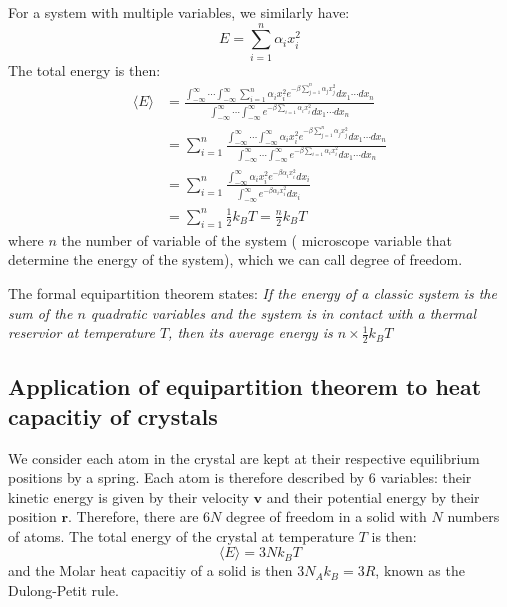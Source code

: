 \documentclass{article}
\begin{document}
For a system with multiple variables, we similarly have:
\begin{equation}
    E = \sum_{i=1}^n \alpha_i x_i^2
\end{equation}
The total energy is then:
\begin{align}
    \langle E \rangle 
        & = \frac{\int_{-\infty}^{\infty}\cdots\int_{-\infty}^{\infty} \sum_{i=1}^n \alpha_i x_i^2 e^{-\beta \sum_{j=1}^n \alpha_j x_j^2} dx_1 \cdots dx_n}{\int_{-\infty}^{\infty}\cdots\int_{-\infty}^{\infty} e^{-\beta \sum_{i=1} \alpha_i x_i^2} dx_1 \cdots dx_n} \\
        & = \sum_{i=1}^n \frac{\int_{-\infty}^{\infty}\cdots\int_{-\infty}^{\infty} \alpha_i x_i^2 e^{-\beta \sum_{j=1}^n \alpha_j x_j^2} dx_1 \cdots dx_n}{\int_{-\infty}^{\infty}\cdots\int_{-\infty}^{\infty} e^{-\beta \sum_{i=1} \alpha_i x_i^2} dx_1 \cdots dx_n} \\
        & = \sum_{i=1}^n \frac{\int_{-\infty}^{\infty} \alpha_i x_i^2 e^{-\beta \alpha_i x_i^2}  dx_i }{\int_{-\infty}^{\infty} e^{-\beta \alpha_i x_i^2}  dx_i } \\
        & = \sum_{i=1}^n  \frac{1}{2} k_B T = \frac{n}{2} k_B T
\end{align}
where $n$ the number of variable of the system ( microscope variable that determine the energy of the system), which we can call degree of freedom.

The formal equipartition theorem states: \emph{ If the energy of a classic system is the sum
of the $n$ quadratic variables and the system is in contact with a thermal reservior at temperature $T$, 
then its average energy is $n\times \frac{1}{2}k_B T$}

\subsection{Application of equipartition theorem to heat capacitiy of crystals}
We consider each atom in the crystal are kept at their respective equilibrium positions
by a spring. Each atom is therefore described by 6 variables: their kinetic energy
is given by their velocity $\mathbf{v}$ and their potential energy by their 
position $\mathbf{r}$. Therefore, there are $6N$ degree of freedom in a solid 
with $N$ numbers of atoms. The total energy of the crystal at temperature $T$
is then:
\begin{equation}
    \langle E \rangle = 3N k_B T
\end{equation}
and the Molar heat capacitiy of a solid is then $3N_A k_B = 3R$, known as the Dulong-Petit rule.
\end{document}
